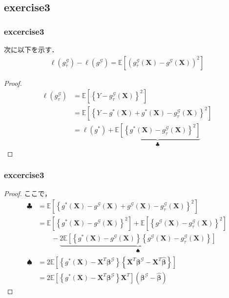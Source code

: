 \documentclass[dvipdfmx,cjk]{beamer}
\theoremstyle{example}
\begin{document}
\subsection{exercise3}
\begin{frame}
    \frametitle{excercise3}
    次に以下を示す．
    \begin{align*}
        \ell(g^\mathcal{G}_\tau)-\ell(g^\mathcal{G})=\mathbb{E}\left[(g^\mathcal{G}_\tau(\boldsymbol{X})-g^\mathcal{G}(\boldsymbol{X}))^2\right]
    \end{align*}
    \begin{proof}
        \begin{align*}
            \ell(g^\mathcal{G}_\tau) & =\mathbb{E}\left[\left\{Y-g^\mathcal{G}_\tau(\boldsymbol{X})\right\}^2\right]                                                             \\
                                     & =\mathbb{E}\left[\left\{Y-g^*(\boldsymbol{X})+g^*(\boldsymbol{X})-g^\mathcal{G}_\tau(\boldsymbol{X})\right\}^2\right]                     \\
                                     & =\ell(g^*)+\underbrace{\mathbb{E}\left[\left\{g^*(\boldsymbol{X})-g^\mathcal{G}_\tau(\boldsymbol{X})\right\}^2\right]}_\text{$\clubsuit$}
        \end{align*}
        \renewcommand{\qedsymbol}{}
    \end{proof}
\end{frame}

\begin{frame}
    \frametitle{excercise3}
    \begin{proof}
        ここで，
        \begin{align*}
            \clubsuit  & = \mathbb{E}\left[\left\{g^*(\boldsymbol{X})-g^\mathcal{G}(\boldsymbol{X})+g^\mathcal{G}(\boldsymbol{X})-g^\mathcal{G}_\tau(\boldsymbol{X})\right\}^2\right]                                                     \\
                       & =\mathbb{E}\left[\left\{g^*(\boldsymbol{X})-g^\mathcal{G}(\boldsymbol{X})\right\}^2\right]+\mathbb{E}\left[\left\{g^\mathcal{G}(\boldsymbol{X})-g^\mathcal{G}_\tau(\boldsymbol{X})\right\}^2\right]              \\
                       & \qquad -\underbrace{2\mathbb{E}\left[\left\{g^*(\boldsymbol{X})-g^\mathcal{G}(\boldsymbol{X})\right\}\left\{g^\mathcal{G}(\boldsymbol{X})-g^\mathcal{G}_\tau(\boldsymbol{X})\right\}\right]}_\text{$\spadesuit$} \\
            \spadesuit & =2\mathbb{E}\left[\left\{g^*(\boldsymbol{X})-\boldsymbol{X}^T\boldsymbol{\beta}^\mathcal{G}\right\}\left\{\boldsymbol{X}^T\boldsymbol{\beta}^\mathcal{G}-\boldsymbol{X}^T\hat{\boldsymbol{\beta}}\right\}\right] \\
                       & =2\mathbb{E}\left[\left\{g^*(\boldsymbol{X})-\boldsymbol{X}^T\boldsymbol{\beta}^\mathcal{G}\right\}\boldsymbol{X}^T\right](\boldsymbol{\beta}^\mathcal{G}-\hat{\boldsymbol{\beta}})
        \end{align*}
        \renewcommand{\qedsymbol}{}
    \end{proof}
\end{frame}
\end{document}
